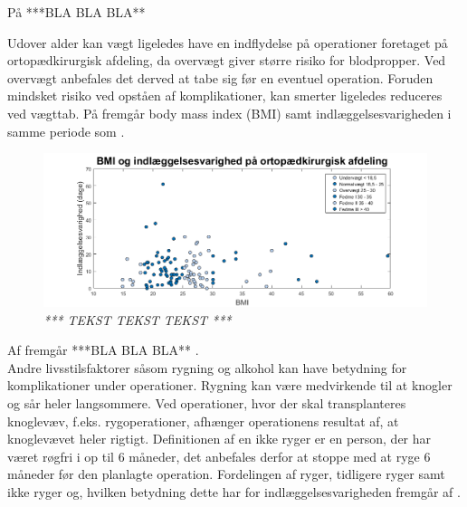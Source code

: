 \noindent
På   ***BLA BLA BLA**




Udover alder kan vægt ligeledes have en indflydelse på operationer foretaget på ortopædkirurgisk afdeling, da overvægt giver større risiko for blodpropper\cite{Ermonds2004}. Ved overvægt anbefales det derved at tabe sig før en eventuel operation. Foruden mindsket risiko ved opståen af komplikationer, kan smerter ligeledes reduceres ved vægttab.\cite{Nordjylland2014} På  fremgår body mass index (BMI) samt indlæggelsesvarigheden i samme periode som .


\begin{figure}[H]
	\centering
	\includegraphics[scale=0.55]{figures/BMIogindlaeg}
	\caption{\textit{ *** TEKST TEKST TEKST *** }}
	\label{BMIogindlaeggelse}
\end{figure}




\noindent
Af  fremgår ***BLA BLA BLA** .\\




\noindent
Andre livsstilsfaktorer såsom rygning og alkohol kan have betydning for komplikationer under operationer. Rygning kan være medvirkende til at knogler og sår heler langsommere. Ved operationer, hvor der skal transplanteres knoglevæv, f.eks. rygoperationer, afhænger operationens resultat af, at knoglevævet heler rigtigt. Definitionen af en ikke ryger er en person, der har været røgfri i op til 6 måneder, det anbefales derfor at stoppe med at ryge 6 måneder før den planlagte operation.\cite{Nordjylland2014} Fordelingen af ryger, tidligere ryger samt ikke ryger og, hvilken betydning dette har for indlæggelsesvarigheden fremgår af .


